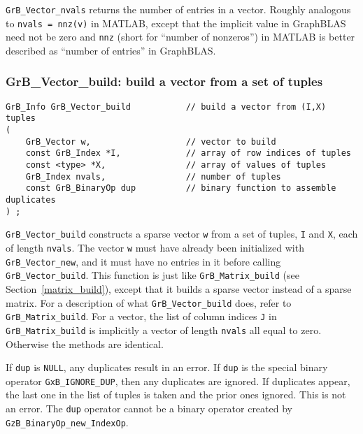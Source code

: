 \documentclass[12pt]{article}
\begin{document}
\verb'GrB_Vector_nvals' returns the number of entries in a vector.  Roughly
analogous to \verb'nvals = nnz(v)' in MATLAB, except that the implicit value in
GraphBLAS need not be zero and \verb'nnz' (short for ``number of nonzeros'') in
MATLAB is better described as ``number of entries'' in GraphBLAS.

\newpage
\subsubsection{{\sf GrB\_Vector\_build:}         build a vector from a set of tuples}
\label{vector_build}

\begin{mdframed}[userdefinedwidth=6in]
{\footnotesize
\begin{verbatim}
GrB_Info GrB_Vector_build           // build a vector from (I,X) tuples
(
    GrB_Vector w,                   // vector to build
    const GrB_Index *I,             // array of row indices of tuples
    const <type> *X,                // array of values of tuples
    GrB_Index nvals,                // number of tuples
    const GrB_BinaryOp dup          // binary function to assemble duplicates
) ;
\end{verbatim}
} \end{mdframed}

\verb'GrB_Vector_build' constructs a sparse vector \verb'w' from a set of
tuples, \verb'I' and \verb'X', each of length \verb'nvals'.  The vector
\verb'w' must have already been initialized with \verb'GrB_Vector_new', and it
must have no entries in it before calling \verb'GrB_Vector_build'.
This function is just like \verb'GrB_Matrix_build' (see
Section~\ref{matrix_build}), except that it builds a sparse vector instead of a
sparse matrix.  For a description of what \verb'GrB_Vector_build' does, refer
to \verb'GrB_Matrix_build'.  For a vector, the list of column indices \verb'J'
in \verb'GrB_Matrix_build' is implicitly a vector of length \verb'nvals' all
equal to zero.  Otherwise the methods are identical.

If \verb'dup' is \verb'NULL', any duplicates result in an error.
If \verb'dup' is the special binary operator \verb'GxB_IGNORE_DUP', then
any duplicates are ignored.  If duplicates appear, the last one in the
list of tuples is taken and the prior ones ignored.  This is not an error.
%
The \verb'dup' operator cannot be a binary operator
created by \verb'GzB_BinaryOp_new_IndexOp'.
\end{document}
